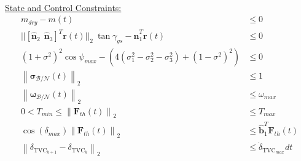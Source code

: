 \begin{mdframed}
\begin{align*}
\end{align*}
%
\underline{State and Control Constraints:}  
\begin{align*}
m_{dry} - m(t) & \leq 0 \\
|| [\hat{\bm{n}}_2 \ \ \hat{\bm{n}}_3 ]^T \mathbf{r}(t) \lvert\lvert_2 \ \tan{\gamma_{gs}}  - \hat{\bm{n}}_1^T \mathbf{r}(t) & \leq 0 \\
%
(1+\sigma^2)^2\cos{\psi_{max}} - \left(4(\sigma_1^2 - \sigma_2^2 - \sigma_3^2) + (1-\sigma^2)^2 \right) & \leq 0 \\
%
\left \lVert \boldsymbol{\sigma}_\mathcal{B/N}(t) \right \lVert_2 & \leq 1 \\
%
\left \lVert \bm{\omega}_\mathcal{B/N}(t) \right \lVert_2 & \leq \omega_{max}\\
0 < T_{min} \leq \left \lVert \bm{F}_{th}(t) \right \lVert_2 &\leq T_{max} \\
\cos(\delta_{max}) \left \lVert \bm{F}_{th}(t) \right \lVert_2 &\leq \hat{\bm{b}}_1^T \bm{F}_{th}(t) \\
\left \lVert \delta_{\text{TVC}_{k+1}} - \delta_{\text{TVC}_{k}} \right \lVert_2 & \leq \dot{\delta}_{\text{TVC}_{max}}dt
\end{align*}
\end{mdframed}































